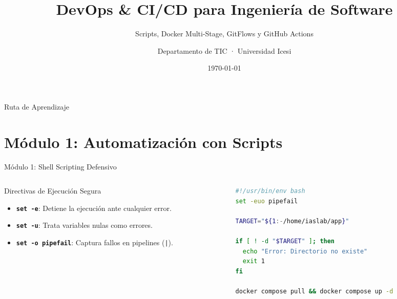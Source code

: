 \documentclass[aspectratio=169,10pt]{beamer}
\title[DevOps \& CI/CD]{DevOps \& CI/CD para Ingeniería de Software}
\subtitle{Scripts, Docker Multi-Stage, GitFlows y GitHub Actions}
\author[IasLab · Icesi]{Departamento de TIC · Universidad Icesi}
\institute[ICESI]{Facultad de Ingeniería · Infraestructura IasLab}
\date{\today}
\begin{document}
\begin{frame}[plain]
  \titlepage
\end{frame}

\begin{frame}{Ruta de Aprendizaje}
  \tableofcontents
\end{frame}

\section{Módulo 1: Automatización con Scripts}

\begin{frame}[fragile]{Módulo 1: Shell Scripting Defensivo}
  \begin{columns}
    \begin{column}{0.5\textwidth}
      \begin{block}{Directivas de Ejecución Segura}
        \begin{itemize}
          \item \textbf{\texttt{set -e}}: Detiene la ejecución ante cualquier error.
          \item \textbf{\texttt{set -u}}: Trata variables nulas como errores.
          \item \textbf{\texttt{set -o pipefail}}: Captura fallos en pipelines (\texttt{|}).
        \end{itemize}
      \end{block}
    \end{column}
    \begin{column}{0.5\textwidth}
      \begin{lstlisting}[language=bash,title=deploy-safe.sh]
#!/usr/bin/env bash
set -euo pipefail

TARGET="${1:-/home/iaslab/app}"

if [ ! -d "$TARGET" ]; then
  echo "Error: Directorio no existe"
  exit 1
fi

docker compose pull && docker compose up -d
      \end{lstlisting}
    \end{column}
  \end{columns}
\end{frame}
\end{document}
